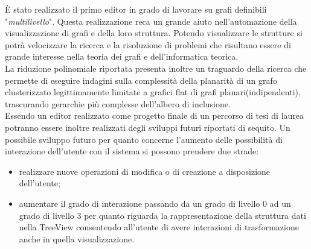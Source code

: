\large{
È stato realizzato il primo editor in grado di lavorare su grafi definibili "\textit{multilivello}". Questa realizzazione reca un grande aiuto nell'automazione della visualizzazione di grafi e della loro struttura. Potendo visualizzare le strutture si potrà velocizzare la ricerca e la risoluzione di problemi che risultano essere di grande interesse nella teoria dei grafi e dell'informatica teorica.\\
La riduzione polinomiale riportata presenta inoltre un traguardo della ricerca che permette di eseguire indagini sulla complessità della planarità di un grafo clusterizzato legittimamente limitate a grafici flat di grafi planari(indipendenti), trascurando gerarchie più complesse dell'albero di inclusione.\\
Essendo un editor realizzato come progetto finale di un percorso di tesi di laurea potranno essere inoltre realizzati degli sviluppi futuri riportati di sequito.
Un possibile sviluppo futuro per quanto concerne l'aumento delle possibilità di interazione dell'utente con il sistema si possono prendere due strade:
\begin{itemize}
	\item realizzare nuove operazioni di modifica o di creazione a disposizione dell'utente;
	\item aumentare il grado di interazione passando da un grado di livello $0$ ad un grado di livello $3$ per quanto riguarda la rappresentazione della struttura dati nella TreeView consentendo all'utente di avere interazioni di trasformazione anche in quella visualizzazione.
\end{itemize}

}
